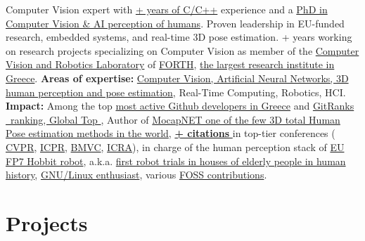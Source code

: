 \documentclass[a4,8pt]{article}
\newcommand{\hskills}[1]{
\textbf{\bfseries #1} }
\begin{document}
Computer Vision expert with \href{https://www.openhub.net/accounts/AmmarkoV/languages}{\cyearsexperience+ years of C/C++} experience and a \href{https://www.didaktorika.gr/eadd/handle/10442/56972}{PhD in Computer Vision \& AI perception of humans}. Proven leadership in EU-funded research, embedded systems, and real-time 3D pose estimation. \cvrlyears+ years working on research projects specializing on Computer Vision as member of the \href{https://www.ics.forth.gr/cvrl}{Computer Vision and Robotics Laboratory} of \href{https://www.forth.gr/en/home/}{FORTH}, \href{https://www.forth.gr/en/content/FORTHs-Excellence.111/}{the largest research institute in Greece}. \hskills{Areas of expertise:} \href{https://www.youtube.com/watch?v=aaLOSY_p6Zc}{Computer Vision, Artificial Neural Networks, 3D human perception and pose estimation}, Real-Time Computing, Robotics, HCI. \hskills{Impact:} Among the top \href{https://committers.top/greece}{most active Github developers in Greece} and \href{https://gitranks.com/profile/AmmarkoV}{GitRanks \gitrankstier\ ranking, Global Top \gitrankspercent}, Author of \href{https://github.com/FORTH-ModelBasedTracker/MocapNET}{MocapNET one of the few 3D total Human Pose estimation methods in the world}, \href{https://scholar.google.gr/citations?user=sDOdhtwAAAAJ&hl=en}{\bf{\citationcount+ citations} }in top-tier conferences ( \href{http://users.ics.forth.gr/~argyros/mypapers/2015_06_CVPR_fsv.pdf}{CVPR}, \href{http://users.ics.forth.gr/~argyros/mypapers/2021_01_ICPR_Qammaz.pdf}{ICPR}, \href{http://users.ics.forth.gr/~argyros/mypapers/2021_11_BMVC_Qammaz.pdf}{BMVC}, \href{https://rasevents.org/uploads/documents/pdfviewer/e7/b9/223574-2731.pdf}{ICRA}), in charge of the human perception stack of \href{http://hobbit.acin.tuwien.ac.at/}{EU FP7 Hobbit robot}, a.k.a. \href{https://www.youtube.com/watch?v=eXbdmq6OIvU&}{first robot trials in houses of elderly people in human history}, \href{https://raw.githubusercontent.com/AmmarkoV/AmmarkoV/master/images/rms-300x225.jpg}{GNU/Linux enthusiast}, various \href{https://github.com/AmmarkoV/}{FOSS contributions}. \vspace{-0.2cm}

\section{Projects} %
\linespread{0.6} 
\vspace{-0.1cm}
\end{document}
